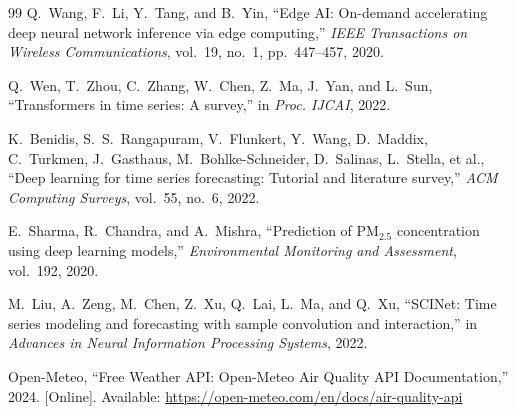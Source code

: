 \begin{thebibliography}{99}
Q.~Wang, F.~Li, Y.~Tang, and B.~Yin, ``Edge AI: On-demand accelerating deep neural network inference via edge computing,'' \textit{IEEE Transactions on Wireless Communications}, vol.~19, no.~1, pp.~447--457, 2020.

Q.~Wen, T.~Zhou, C.~Zhang, W.~Chen, Z.~Ma, J.~Yan, and L.~Sun, ``Transformers in time series: A survey,'' in \textit{Proc. IJCAI}, 2022.

K.~Benidis, S.~S.~Rangapuram, V.~Flunkert, Y.~Wang, D.~Maddix, C.~Turkmen, J.~Gasthaus, M.~Bohlke-Schneider, D.~Salinas, L.~Stella, et al., ``Deep learning for time series forecasting: Tutorial and literature survey,'' \textit{ACM Computing Surveys}, vol.~55, no.~6, 2022.

E.~Sharma, R.~Chandra, and A.~Mishra, ``Prediction of PM$_{2.5}$ concentration using deep learning models,'' \textit{Environmental Monitoring and Assessment}, vol.~192, 2020.

M.~Liu, A.~Zeng, M.~Chen, Z.~Xu, Q.~Lai, L.~Ma, and Q.~Xu, ``SCINet: Time series modeling and forecasting with sample convolution and interaction,'' in \textit{Advances in Neural Information Processing Systems}, 2022.

Open-Meteo, ``Free Weather API: Open-Meteo Air Quality API Documentation,'' 2024. [Online]. Available: \url{https://open-meteo.com/en/docs/air-quality-api}

\end{thebibliography}
